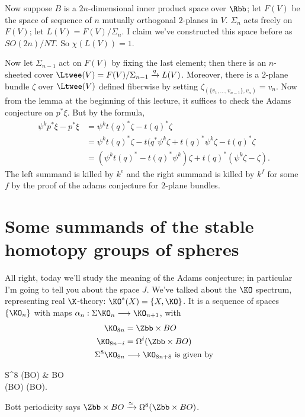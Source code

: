 Now suppose $B$ is a $2n$-dimensional inner product space over $\Rbb$; let $F(V)$ be the space of sequence of $n$ mutually orthogonal $2$-planes in $V$.  $\Sigma_n$ acts freely on $F(V)$; let $L(V) = F(V) / \Sigma_n$.  I claim we've constructed this space before as $SO(2n)/NT$.  So $\chi(L(V)) = 1$.

Now let $\Sigma_{n-1}$ act on $F(V)$ by fixing the last element; then there is an $n$-sheeted cover $\Ltwee(V) = F(V)/\Sigma_{n-1} \xrightarrow{q} L(V)$.  Moreover, there is a $2$-plane bundle $\zeta$ over $\Ltwee(V)$ defined fiberwise by setting $\zeta_{(\{v_1, \ldots, v_{n-1}\}, v_n)} = v_n$.  Now from the lemma at the beginning of this lecture, it suffices to check the Adams conjecture on $p^* \xi$.  But by the formula,
\begin{align*}
\psi^k p^* \xi - p^* \xi & = \psi^k t(q)^* \zeta - t(q)^* \zeta \\
& = \psi^k t(q)^* \zeta - t(q^* \psi^k \zeta + t(q)^* \psi^k \zeta - t(q)^* \zeta \\
& = (\psi^k t(q)^* - t(q)^* \psi^k) \zeta + t(q)^*(\psi^k \zeta - \zeta).
\end{align*}
The left summand is killed by $k^e$ and the right summand is killed by $k^f$ for some $f$ by the proof of the adams conjecture for $2$-plane bundles.

\fi
\BoxedNote{}

\section{Some summands of the stable homotopy groups of spheres} %
\label{SomeSummandsOfStableHomotopyOfSpheres}
\ifx\OutputSomeSummandsOfStableHomotopyOfSpheres\undefined\else
All right, today we'll study the meaning of the Adams conjecture; in particular I'm going to tell you about the space $J$.  We've talked about the $\KO$ spectrum, representing real $\K$-theory: $\KO^*(X) = \{X, \KO\}$.  It is a sequence of spaces $\{\KO_n\}$ with maps $\alpha_n: \Suspend \KO_n \to \KO_{n+1}$, with
\begin{align*}
\KO_{8n} & = \Zbb \times BO \\
\KO_{8n-i} & = \Loops^i (\Zbb \times BO) \\
\Suspend^8 \KO_{8n} & \to \KO_{8n+8} \hbox{ is given by}
\end{align*}
\begin{ctikzcd}
S^8 \sprod (\Zbb \times BO) \dar\rar & \Zbb \times BO \\
(\Zbb \times BO) \sprod (\Zbb \times BO)\urar["\mu"].
\end{ctikzcd}
Bott periodicity says $\Zbb \times BO \xrightarrow{\simeq} \Loops^8(\Zbb \times BO)$.

